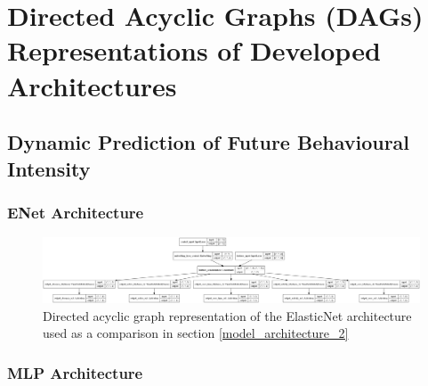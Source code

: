 \chapter{Directed Acyclic Graphs (DAGs) Representations of Developed Architectures}

\section{Dynamic Prediction of Future Behavioural Intensity}

\subsection{ENet Architecture}
\begin{figure}[H]
\centering
\includegraphics[width=\textwidth,height=\textheight,keepaspectratio]{images/appendix_B/enet_2.png}
\caption[\textbf{ElasticNet DAG - Section \ref{model_architecture_2}}]{Directed acyclic graph representation of the ElasticNet architecture used as a comparison in section \ref{model_architecture_2}}
\label{enet_2_dag}
\end{figure}

\subsection{MLP Architecture}


